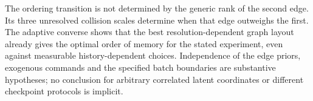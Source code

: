 The ordering transition is not determined by the generic rank of the
second edge. Its three unresolved collision scales determine when
that edge outweighs the first. The adaptive converse shows that the
best resolution-dependent graph layout already gives the optimal
order of memory for the stated experiment, even against measurable
history-dependent choices. Independence of the edge priors, exogenous
commands and the specified batch boundaries are substantive hypotheses;
no conclusion for arbitrary correlated latent coordinates or different
checkpoint protocols is implicit.
